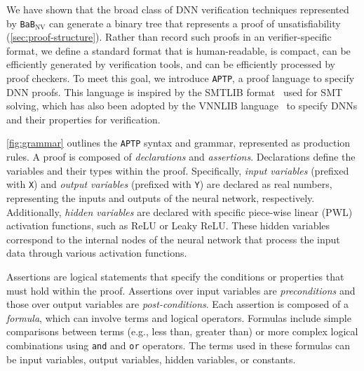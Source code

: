 \documentclass[oneside,11pt,dvipsnames]{book}
\newcommand{\functiontextformat}[1]{\textrm{\texttt{#1}}}
\newcommand{\nnproofformat}{\texttt{APTP}}
\newcommand{\dd}{\texttt{BaB$_{\text{NV}}$}}
\begin{document}
We have shown that the broad class of DNN verification techniques represented by \dd{}
can generate a binary tree that represents a proof of unsatisfiability  (\autoref{sec:proof-structure}). 
Rather than record such proofs in an verifier-specific format, we define a standard format
that is human-readable, is compact, can be efficiently generated by verification tools, and can
be efficiently processed by proof checkers.  
To meet this goal, we introduce \nnproofformat{}, a proof language to specify DNN proofs.
This language is inspired by the SMTLIB format~\cite{barrett2010smt} used for SMT solving, which has also been adopted by the  VNNLIB language~\cite{vnnlib} to specify DNNs and their properties for  verification.


\autoref{fig:grammar} outlines the \nnproofformat{} syntax and grammar, represented as production rules. 
A proof is composed of \textit{declarations} and \textit{assertions}. Declarations define the variables and their types within the proof. Specifically, \textit{input variables} (prefixed with \functiontextformat{X}) and \textit{output variables} (prefixed with \functiontextformat{Y}) are declared as real numbers, representing the inputs and outputs of the neural network, respectively. Additionally, \textit{hidden variables} are declared with specific piece-wise linear (PWL) activation functions, such as ReLU or Leaky ReLU. These hidden variables correspond to the internal nodes of the neural network that process the input data through various activation functions.

Assertions are logical statements that specify the conditions or properties that must hold within the proof. Assertions over input variables are \emph{preconditions} and those over output variables are \emph{post-conditions}. Each assertion is composed of a \textit{formula}, which can involve terms and logical operators. Formulas include simple comparisons between terms (e.g., less than, greater than) or more complex logical combinations using \functiontextformat{and} and \functiontextformat{or} operators. The terms used in these formulas can be input variables, output variables, hidden variables, or constants.
\end{document}
